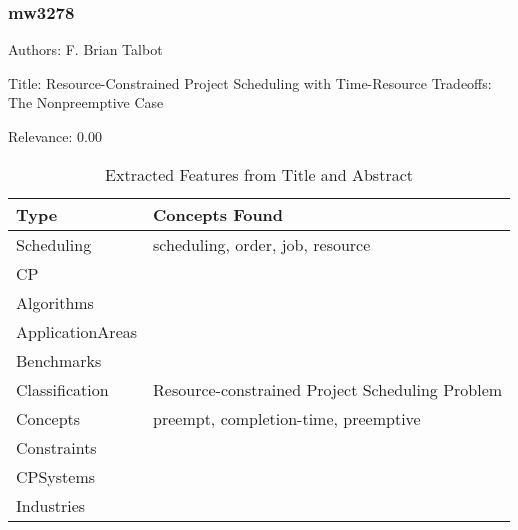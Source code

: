 \subsubsection{mw3278}
\label{mw:mw3278}

Authors: F. Brian Talbot

Title: Resource-Constrained Project Scheduling with Time-Resource Tradeoffs: The Nonpreemptive Case

Relevance:  0.00

{\scriptsize
\begin{longtable}{p{2cm}p{20cm}}
\caption{Extracted Features from Title and Abstract}\\ \toprule
Type & Concepts Found\\ \midrule
\endhead
\bottomrule
\endfoot
Scheduling & scheduling, order, job, resource\\ 
CP & \\ 
Algorithms & \\ 
ApplicationAreas & \\ 
Benchmarks & \\ 
Classification & Resource-constrained Project Scheduling Problem\\ 
Concepts & preempt, completion-time, preemptive\\ 
Constraints & \\ 
CPSystems & \\ 
Industries & \\ 
\end{longtable}
}

